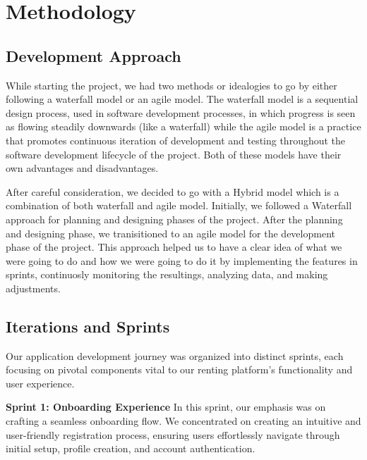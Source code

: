 
\chapter{Methodology}

\label{Chapter3} %

\section{Development Approach}

While starting the project, we had two methods or idealogies to go by
either following a waterfall model or an agile model. The waterfall model
is a sequential design process, used in software development processes,
in which progress is seen as flowing steadily downwards (like a waterfall)
while the agile model is a practice that promotes continuous iteration of
development and testing throughout the software development lifecycle of the
project. Both of these models have their own advantages and disadvantages.\par\medskip

After careful consideration, we decided to go with a Hybrid model which is a
combination of both waterfall and agile model. Initially, we followed a Waterfall approach
for planning and designing phases of the project. After the planning and designing phase,
we tranisitioned to an agile model for the development phase of the project. This approach
helped us to have a clear idea of what we were going to do and how we were going to do it by
implementing the features in sprints, continuosly monitoring the resultings, analyzing data, and making
adjustments.

\section{Iterations and Sprints}
Our application development journey was organized into distinct sprints, each focusing on pivotal components vital to our renting platform's functionality and user experience.\par\medskip
\clearpage

\textbf{Sprint 1: Onboarding Experience}
In this sprint, our emphasis was on crafting a seamless onboarding flow. We concentrated on creating an intuitive and user-friendly registration process, ensuring users effortlessly navigate through initial setup, profile creation, and account authentication.\medskip

